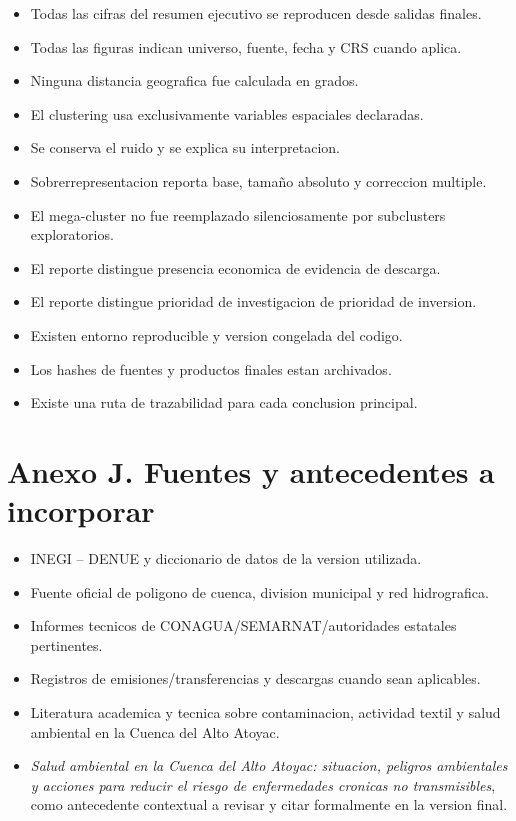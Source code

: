\documentclass[11pt,letterpaper]{article}
\begin{document}
\begin{itemize}
    \item[$\square$] Todas las cifras del resumen ejecutivo se reproducen desde salidas finales.
    \item[$\square$] Todas las figuras indican universo, fuente, fecha y CRS cuando aplica.
    \item[$\square$] Ninguna distancia geografica fue calculada en grados.
    \item[$\square$] El clustering usa exclusivamente variables espaciales declaradas.
    \item[$\square$] Se conserva el ruido y se explica su interpretacion.
    \item[$\square$] Sobrerrepresentacion reporta base, tamaño absoluto y correccion multiple.
    \item[$\square$] El mega-cluster no fue reemplazado silenciosamente por subclusters exploratorios.
    \item[$\square$] El reporte distingue presencia economica de evidencia de descarga.
    \item[$\square$] El reporte distingue prioridad de investigacion de prioridad de inversion.
    \item[$\square$] Existen entorno reproducible y version congelada del codigo.
    \item[$\square$] Los hashes de fuentes y productos finales estan archivados.
    \item[$\square$] Existe una ruta de trazabilidad para cada conclusion principal.
\end{itemize}

\section{Anexo J. Fuentes y antecedentes a incorporar}

\begin{itemize}
    \item INEGI -- DENUE y diccionario de datos de la version utilizada.
    \item Fuente oficial de poligono de cuenca, division municipal y red hidrografica.
    \item Informes tecnicos de CONAGUA/SEMARNAT/autoridades estatales pertinentes.
    \item Registros de emisiones/transferencias y descargas cuando sean aplicables.
    \item Literatura academica y tecnica sobre contaminacion, actividad textil y salud ambiental en la Cuenca del Alto Atoyac.
    \item \textit{Salud ambiental en la Cuenca del Alto Atoyac: situacion, peligros ambientales y acciones para reducir el riesgo de enfermedades cronicas no transmisibles}, como antecedente contextual a revisar y citar formalmente en la version final.
\end{itemize}
\end{document}
